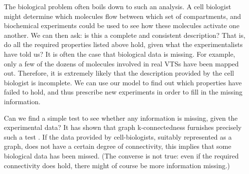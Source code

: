 The biological problem often boils down to such an analysis. A cell biologist might determine which molecules flow between which set of compartments, and biochemical experiments could be used to see how these molecules activate one another. We can then ask: is this a complete and consistent description? That is, do all the required properties listed above hold, given what the experimentalists have told us? It is often the case that biological data is missing. For example, only a few of the dozens of molecules involved in real VTSs have been mapped out. Therefore, it is extremely likely that the description provided by the cell biologist is incomplete. We can use our model to find out which properties have failed to hold, and thus prescribe new experiments in order to fill in the missing information.

Can we find a simple test to see whether any information is missing, given the experimental data? It has shown that graph k-connectedness furnishes precisely such a test \cite{shukla2017discovering}.
%
If the data provided by cell-biologists, suitably represented as a graph, does not have a certain degree of connectivity, this implies that some biological data has been missed. (The converse is not true: even if the required connectivity does hold, there might of course be more information missing.)




